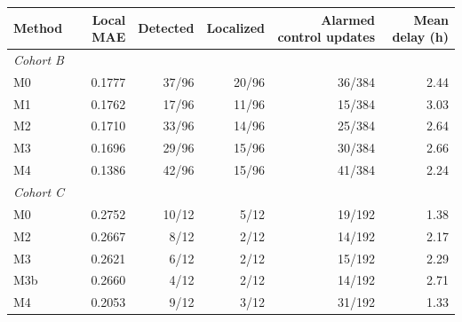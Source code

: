 \begin{tabular}{lrrrrr}\toprule
Method & Local MAE & Detected & Localized & Alarmed control updates & Mean delay (h)\\\midrule
\multicolumn{6}{l}{\textit{Cohort B}} \\
M0 & 0.1777 & 37/96 & 20/96 & 36/384 & 2.44 \\
M1 & 0.1762 & 17/96 & 11/96 & 15/384 & 3.03 \\
M2 & 0.1710 & 33/96 & 14/96 & 25/384 & 2.64 \\
M3 & 0.1696 & 29/96 & 15/96 & 30/384 & 2.66 \\
M4 & 0.1386 & 42/96 & 15/96 & 41/384 & 2.24 \\
\multicolumn{6}{l}{\textit{Cohort C}} \\
M0 & 0.2752 & 10/12 & 5/12 & 19/192 & 1.38 \\
M2 & 0.2667 & 8/12 & 2/12 & 14/192 & 2.17 \\
M3 & 0.2621 & 6/12 & 2/12 & 15/192 & 2.29 \\
M3b & 0.2660 & 4/12 & 2/12 & 14/192 & 2.71 \\
M4 & 0.2053 & 9/12 & 3/12 & 31/192 & 1.33 \\
\bottomrule\end{tabular}
